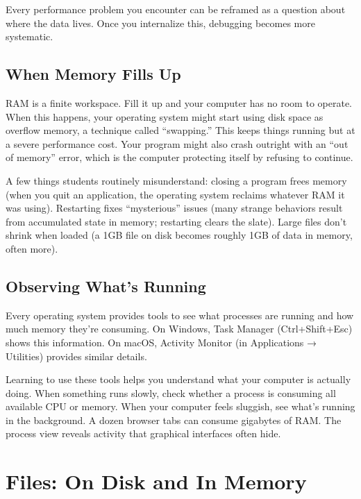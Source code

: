 \documentclass[
  letterpaper,
  DIV=11,
  numbers=noendperiod]{scrreprt}
\begin{document}
Every performance problem you encounter can be reframed as a question
about where the data lives. Once you internalize this, debugging becomes
more systematic.

\subsection{When Memory Fills Up}\label{when-memory-fills-up}

RAM is a finite workspace. Fill it up and your computer has no room to
operate. When this happens, your operating system might start using disk
space as overflow memory, a technique called ``swapping.'' This keeps
things running but at a severe performance cost. Your program might also
crash outright with an ``out of memory'' error, which is the computer
protecting itself by refusing to continue.

A few things students routinely misunderstand: closing a program frees
memory (when you quit an application, the operating system reclaims
whatever RAM it was using). Restarting fixes ``mysterious'' issues (many
strange behaviors result from accumulated state in memory; restarting
clears the slate). Large files don't shrink when loaded (a 1GB file on
disk becomes roughly 1GB of data in memory, often more).

\subsection{Observing What's Running}\label{observing-whats-running}

Every operating system provides tools to see what processes are running
and how much memory they're consuming. On Windows, Task Manager
(Ctrl+Shift+Esc) shows this information. On macOS, Activity Monitor (in
Applications → Utilities) provides similar details.

Learning to use these tools helps you understand what your computer is
actually doing. When something runs slowly, check whether a process is
consuming all available CPU or memory. When your computer feels
sluggish, see what's running in the background. A dozen browser tabs can
consume gigabytes of RAM. The process view reveals activity that
graphical interfaces often hide.

\section{Files: On Disk and In
Memory}\label{files-on-disk-and-in-memory}
\end{document}
